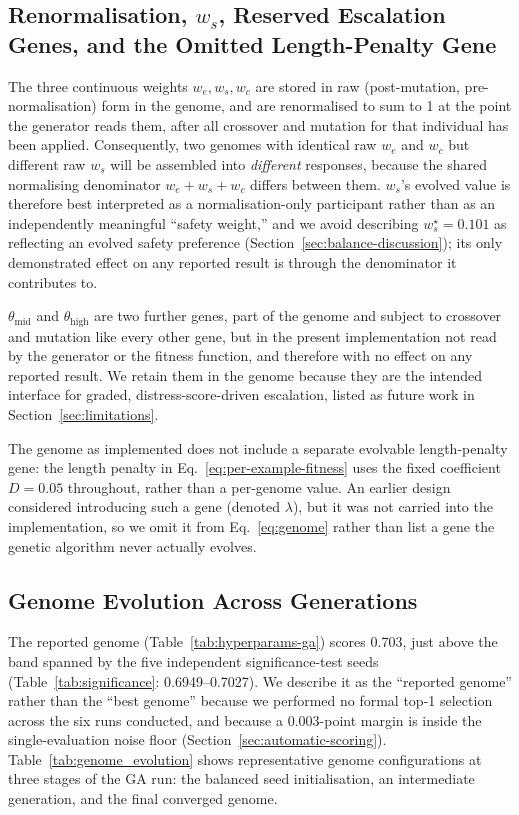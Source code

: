 \documentclass[mathematics,article,submit,xetex,moreauthors]{Definitions/mdpi}
\begin{document}
\subsection{Renormalisation, $w_s$, Reserved Escalation Genes, and the Omitted Length-Penalty Gene}
\label{app:renorm}

The three continuous weights
$w_e, w_s, w_c$ are stored in raw (post-mutation, pre-normalisation) form in
the genome, and are renormalised to sum to 1 at the point the generator
reads them, after all crossover and mutation for that individual has been
applied. Consequently, two genomes with identical raw $w_e$ and $w_c$ but
different raw $w_s$ will be assembled into \emph{different} responses,
because the shared normalising denominator $w_e+w_s+w_c$ differs between
them. $w_s$'s evolved value is therefore best interpreted as a
normalisation-only participant rather than as an independently meaningful
``safety weight,'' and we avoid describing $w_s^{\star}=0.101$ as reflecting
an evolved safety preference (Section~\ref{sec:balance-discussion}); its
only demonstrated effect on any reported result is through the denominator
it contributes to.

$\theta_{\mathrm{mid}}$ and $\theta_{\mathrm{high}}$ are two further genes,
part of the genome and subject to crossover and mutation like every other
gene, but in the present implementation not read by the generator or the
fitness function, and therefore with no effect on any reported result. We
retain them in the genome because they are the intended interface for
graded, distress-score-driven escalation, listed as future work in
Section~\ref{sec:limitations}.

The genome as implemented does not include a separate evolvable length-penalty
gene: the length penalty in Eq.~\eqref{eq:per-example-fitness} uses the fixed
coefficient $D=0.05$ throughout, rather than a per-genome value. An earlier
design considered introducing such a gene (denoted $\lambda$), but it was not
carried into the implementation, so we omit it from Eq.~\eqref{eq:genome}
rather than list a gene the genetic algorithm never actually evolves.

\subsection{Genome Evolution Across Generations}
\label{app:genome-evolution}

The reported genome (Table~\ref{tab:hyperparams-ga}) scores 0.703, just
above the band spanned by the five independent significance-test seeds
(Table~\ref{tab:significance}: 0.6949--0.7027). We describe it as the
``reported genome'' rather than the ``best genome'' because we performed no
formal top-1 selection across the six runs conducted, and because a
0.003-point margin is inside the single-evaluation noise floor
(Section~\ref{sec:automatic-scoring}). Table~\ref{tab:genome_evolution} shows representative genome configurations
at three stages of the GA run: the balanced seed initialisation, an
intermediate generation, and the final converged genome.
\end{document}
